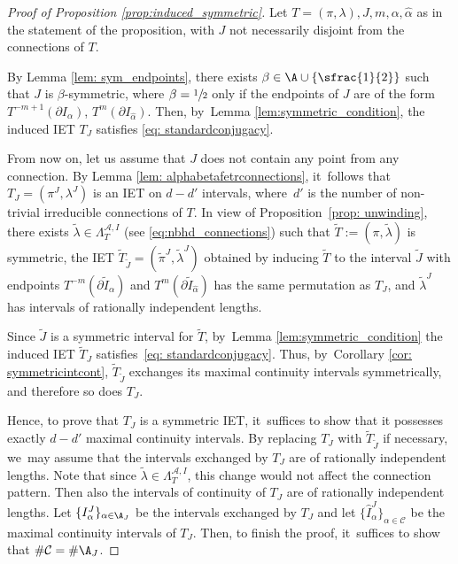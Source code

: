 \begin{proof}[Proof of Proposition \ref{prop:induced_symmetric}]
Let $T = (\pi, \lambda), J, m, \alpha, \hat \alpha$ as in the statement of the proposition, with $J$ not necessarily disjoint from the connections of $T$.

By Lemma \ref{lem: sym_endpoints}, there exists $\beta \in \A \cup \{\sfrac{1}{2}\}$ such that $J$ is $\beta$-symmetric, where $\beta = \sfrac{1}{2}$ only if the endpoints of $J$ are of the form $T^{-m + 1}(\partial I_\alpha)$, $T^m(\partial I_{\hat \alpha})$. Then, by~Lemma \ref{lem:symmetric_condition}, the induced IET $T_J$ satisfies \eqref{eq: standardconjugacy}.

From now on, let us assume that $J$ does not contain any point from any connection.
By Lemma \ref{lem: alphabetafetrconnections}, it~follows that $T_J = (\pi^J, \lambda^J)$ is an IET on $d - d'$ intervals, where~$d'$ is the number of non-trivial irreducible connections of $T$. In view of Proposition~\ref{prop: unwinding}, there exists $\tilde\lambda\in\Lambda^{\mathcal A,I}_T$ (see \eqref{eq:nbhd_connections}) such that $\tilde{T}:=(\pi,\tilde\lambda)$ is symmetric, the IET $\tilde{T}_{\tilde J} = (\tilde \pi^J, \tilde \lambda^J)$ obtained by inducing $\tilde{T}$ to the interval $\tilde J$ with endpoints $T^{-m}(\partial \tilde I_{\alpha})$ and $T^{m}(\partial \tilde I_{\hat\alpha})$ has the same permutation as $T_J$, and $\tilde\lambda^J$ has intervals of rationally independent lengths.

Since $\tilde J$ is a symmetric interval for $\tilde T$, by~Lemma \ref{lem:symmetric_condition} the induced IET $\tilde T_J$ satisfies~\eqref{eq: standardconjugacy}. Thus, by~Corollary \ref{cor: symmetricintcont}, $\tilde{T}_{\tilde J}$ exchanges its maximal continuity intervals symmetrically, and therefore so does $T_J$.

Hence, to prove that $T_J$ is a symmetric IET, it~suffices to show that it possesses exactly $d - d'$ maximal continuity intervals. By replacing $T_J$ with $\tilde{T}_{\tilde J}$ if necessary, we~may assume that the intervals exchanged by $T_{J}$ are of rationally independent lengths. Note that since $\tilde\lambda\in\Lambda^{\mathcal A,I}_T$, this change would not affect the connection pattern. Then also the intervals of continuity of $T_J$ are of rationally independent lengths. Let $\{I^J_{\alpha}\}_{\alpha\in\mathcal \A_J}$ be the intervals exchanged by $T_J$ and let $\{\hat I^J_{\alpha}\}_{\alpha\in\mathcal C}$ be the maximal continuity intervals of $T_J$. Then, to finish the proof, it~suffices to show that $\#\mathcal C = \#\mathcal \A_J$.


\end{proof}
